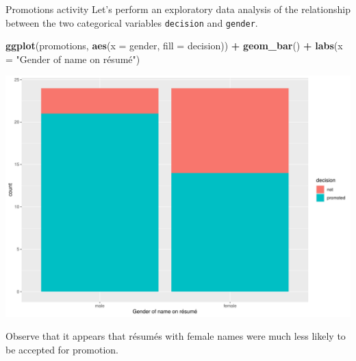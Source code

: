 \documentclass[
  ignorenonframetext,
]{beamer}
\newenvironment{Shaded}{\begin{snugshade}}{\end{snugshade}}
\newcommand{\AttributeTok}[1]{\textcolor[rgb]{0.13,0.29,0.53}{#1}}
\newcommand{\FunctionTok}[1]{\textcolor[rgb]{0.13,0.29,0.53}{\textbf{#1}}}
\newcommand{\NormalTok}[1]{#1}
\newcommand{\SpecialCharTok}[1]{\textcolor[rgb]{0.81,0.36,0.00}{\textbf{#1}}}
\newcommand{\StringTok}[1]{\textcolor[rgb]{0.31,0.60,0.02}{#1}}
\begin{document}
\begin{frame}[fragile]{Promotions activity}
\protect\hypertarget{promotions-activity-3}{}
Let's perform an exploratory data analysis of the relationship between
the two categorical variables \texttt{decision} and \texttt{gender}.

\tiny

\begin{Shaded}
\begin{Highlighting}[]
\FunctionTok{ggplot}\NormalTok{(promotions, }\FunctionTok{aes}\NormalTok{(}\AttributeTok{x =}\NormalTok{ gender, }\AttributeTok{fill =}\NormalTok{ decision)) }\SpecialCharTok{+}
  \FunctionTok{geom\_bar}\NormalTok{() }\SpecialCharTok{+}
  \FunctionTok{labs}\NormalTok{(}\AttributeTok{x =} \StringTok{"Gender of name on résumé"}\NormalTok{)}
\end{Highlighting}
\end{Shaded}

\begin{center}\includegraphics[width=0.7\linewidth,height=0.45\textheight]{Week11_12_13_files/figure-beamer/unnamed-chunk-38-1} \end{center}
\normalsize

Observe that it appears that résumés with female names were much less
likely to be accepted for promotion.
\end{frame}
\end{document}

